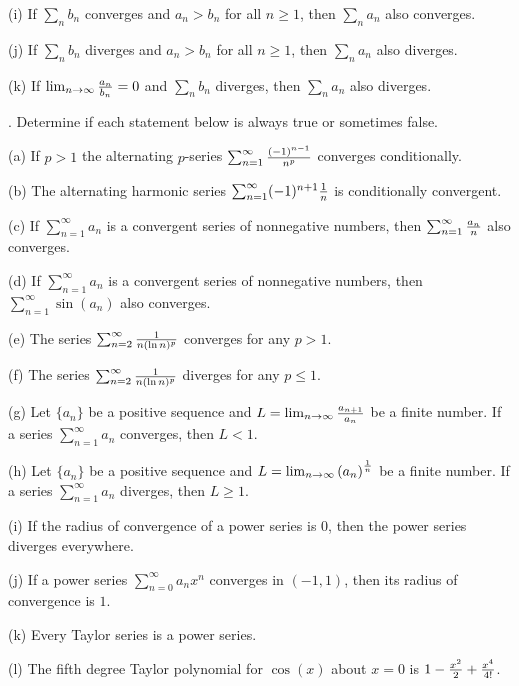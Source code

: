 \documentclass[12pt]{article}
\begin{document}
\noindent (i) If $\sum_n b_n$ converges and $a_n > b_n$ for all $n \ge 1$, 
then $\sum_n a_n$ also converges.

\noindent (j) If $\sum_n b_n$ diverges and $a_n > b_n$ for all $n \ge 1$,
then $\sum_n a_n$ also diverges.

\noindent (k) If $\lim_{n \to \infty} {{a_n}\over{b_n}} = 0$ and $\sum_n 
b_n$ diverges, then $\sum_n a_n$ also diverges. 

\medskip
{}.  Determine if each statement below is always true or 
sometimes false.

\noindent (a) If $p>1$ the alternating $p$-series $\sum_{n=1}^{\infty} 
{{(-1)^{n-1}}\over{n^p}}$ converges conditionally. 

\noindent (b) The alternating harmonic series $\sum_{n=1}^{\infty} 
(-1)^{n+1} {{1}\over{n}}$ is conditionally convergent.

\noindent (c) If $\sum_{n=1}^\infty a_n$ is a convergent series 
of nonnegative numbers, then $\sum_{n=1}^\infty {{a_n}\over{n}}$ 
also converges.

\noindent (d) If $\sum_{n=1}^{\infty} a_n$ is a convergent series of nonnegative numbers, 
then $\sum_{n=1}^{\infty} \sin(a_n)$ also converges.

\noindent (e) The series $\sum_{n=2}^{\infty} {{1}\over{n(\ln n)^p}}$ 
converges for any $p>1$.

\noindent (f) The series $\sum_{n=2}^{\infty} {{1}\over{n(\ln n)^p}}$ 
diverges for any $p\leq 1$.

\noindent (g) Let $\{a_n\}$ be a positive sequence and $L = 
\lim_{n\to \infty} {{a_{n+1}}\over{a_n}}$ be a finite number.
If a series $\sum_{n=1}^{\infty} a_n$ converges, then $L < 1$.

\noindent (h) Let $\{a_n\}$ be a positive sequence and $L = 
\lim_{n\to \infty}\left(a_n\right)^{{1}\over{n}}$ be a finite number.
If a series $\sum_{n=1}^{\infty} a_n$ diverges, then $L \geq 
1$.

\noindent (i) If the radius of convergence of a power series is $0$, then 
the power series diverges everywhere.

\noindent (j) If a power series $\sum_{n=0}^\infty a_nx^n$ converges in 
$(-1,1)$, then its radius of convergence is $1$.

\noindent (k) Every Taylor series is a power series.

\noindent (l) The fifth degree Taylor polynomial for $\cos (x)$ about 
$x=0$ is $1 - {{x^2}\over{2}} + {{x^4}\over{4!}}$.
\end{document}
